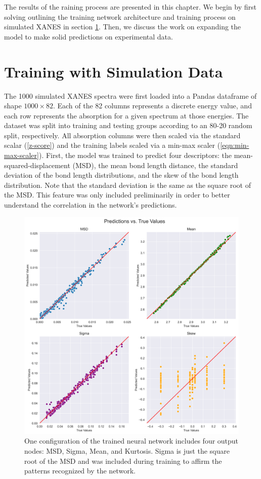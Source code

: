 The results of the raining process are presented in this chapter. We begin by first solving outlining the training network architecture and training process on simulated XANES in section \ref{sec:nn-sim-data}. Then, we discuss the work on expanding the model to make solid predictions on experimental data.

\section{Training with Simulation Data} \label{sec:nn-sim-data}
The 1000 simulated XANES spectra were first loaded into a Pandas dataframe \cite{pandas-1} \cite{pandas-2} of shape $ 1000\times82 $. Each of the 82 columns represents a discrete energy value, and each row represents the absorption for a given spectrum at those energies. The dataset was split into training and testing groups according to an 80-20 random split, respectively. All absorption columns were then scaled via the standard scalar (\ref{z-score}) and the training labels scaled via a min-max scaler (\ref{eqn:min-max-scaler}). First, the model was trained to predict four descriptors: the mean-squared-displacement (MSD), the mean bond length distance, the standard deviation of the bond length distributions, and the skew of the bond length distribution. Note that the standard deviation is the same as the square root of the MSD. This feature was only included preliminarily in order to better understand the correlation in the network's predictions. 

\begin{figure}
    \centering
    \includegraphics[width=\linewidth]{Chapters/Figures/nn_rdf_validation_preds.png}
    \caption{One configuration of the trained neural network includes four output nodes: MSD, Sigma, Mean, and Kurtosis. Sigma is just the square root of the MSD and was included during training to affirm the patterns recognized by the network.}
    \label{fig:train-test-split-all4}
\end{figure}

